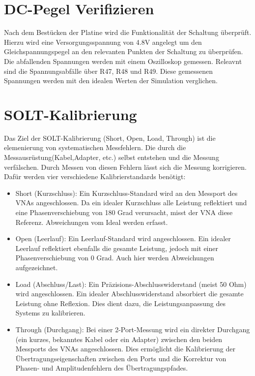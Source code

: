 \section{DC-Pegel Verifizieren}
Nach dem Bestücken der Platine wird die Funktionalität der Schaltung überprüft. Hierzu wird eine Versorgungsspannung von 
4.8V angelegt um den Gleichspannungspegel an den relevanten Punkten der Schaltung zu überprüfen. Die abfallenden 
Spannungen werden mit einem Oszilloskop gemessen. Releavnt sind die Spannungsabfälle über R47, R48 und R49. Diese gemessenen
Spannungen werden mit den idealen Werten 
der Simulation verglichen. 

\section{SOLT-Kalibrierung}
Das Ziel der SOLT-Kalibrierung (Short, Open, Load, Through) ist die elemenierung
von systematischen Messfehlern. Die durch die Messausrüstung(Kabel,Adapter, etc.)
selbst entstehen und die Messung verfälschen.
Durch Messen von diesen Fehlern lässt sich die Messung korrigieren.
Dafür werden vier verschiedene Kalibrierstandards benötigt:
\begin{itemize}
    \item Short (Kurzschluss): Ein Kurzschluss-Standard wird an den Messport des VNAs angeschlossen. Da ein idealer Kurzschluss alle Leistung reflektiert und eine Phasenverschiebung von 180 Grad verursacht, misst der VNA diese Referenz. Abweichungen vom Ideal werden erfasst. 
    \item Open (Leerlauf): Ein Leerlauf-Standard wird angeschlossen. Ein idealer Leerlauf reflektiert ebenfalls die gesamte Leistung, jedoch mit einer Phasenverschiebung von 0 Grad. Auch hier werden Abweichungen aufgezeichnet.
    \item Load (Abschluss/Last): Ein Präzisions-Abschlusswiderstand (meist 50 Ohm) wird angeschlossen. Ein idealer Abschlusswiderstand absorbiert die gesamte Leistung ohne Reflexion. Dies dient dazu, die Leistungsanpassung des Systems zu kalibrieren.
    \item Through (Durchgang): Bei einer 2-Port-Messung wird ein direkter Durchgang (ein kurzes, bekanntes Kabel oder ein Adapter) zwischen den beiden Messports des VNAs angeschlossen. Dies ermöglicht die Kalibrierung der Übertragungseigenschaften zwischen den Ports und die Korrektur von Phasen- und Amplitudenfehlern des Übertragungspfades.
\end{itemize}
\clearpage

